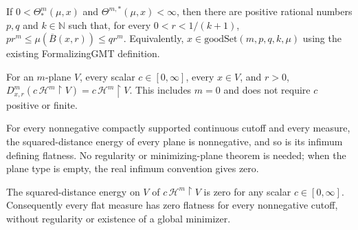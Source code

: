 \begin{lemma}
\label{lem:density-bounds-good-set}

If $0<\Theta_*^m(\mu,x)$ and $\Theta^{m,*}(\mu,x)<\infty$, then there are positive rational numbers $p,q$ and $k\in\mathbb N$ such that, for every $0<r<1/(k+1)$, $p r^m\leq\mu(\overline B(x,r))\leq q r^m$. Equivalently, $x\in\mathrm{goodSet}(m,p,q,k,\mu)$ using the existing FormalizingGMT definition.
\end{lemma}

\begin{lemma}
\label{lem:flat-plane-blowup}

For an $m$-plane $V$, every scalar $c\in[0,\infty]$, every $x\in V$, and $r>0$, $D^m_{x,r}(c\,\mathcal H^m\!\restriction V)=c\,\mathcal H^m\!\restriction V$. This includes $m=0$ and does not require $c$ positive or finite.
\end{lemma}

\begin{lemma}
\label{lem:flatness-basic-nonneg}

For every nonnegative compactly supported continuous cutoff and every measure, the squared-distance energy of every plane is nonnegative, and so is its infimum defining flatness. No regularity or minimizing-plane theorem is needed; when the plane type is empty, the real infimum convention gives zero.
\end{lemma}

\begin{lemma}
\label{lem:flatness-basic-zero}

The squared-distance energy on $V$ of $c\,\mathcal H^m\!\restriction V$ is zero for any scalar $c\in[0,\infty]$. Consequently every flat measure has zero flatness for every nonnegative cutoff, without regularity or existence of a global minimizer.
\end{lemma}

